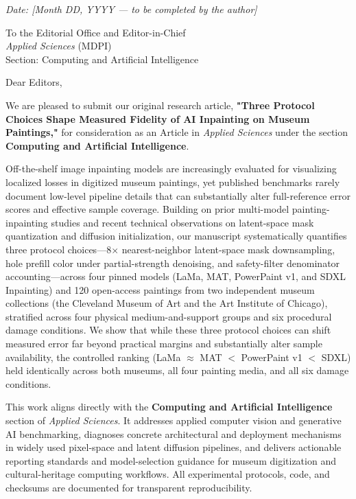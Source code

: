\documentclass[11pt,a4paper]{article}
\begin{document}
\emph{Date: {[}Month DD, YYYY --- to be completed by the author{]}}

To the Editorial Office and Editor-in-Chief\\
\emph{Applied Sciences} (MDPI)\\
Section: Computing and Artificial Intelligence

Dear Editors,

We are pleased to submit our original research article, \textbf{"Three Protocol Choices Shape Measured Fidelity of AI Inpainting on Museum Paintings,"} for consideration as an Article in \emph{Applied Sciences} under the section \textbf{Computing and Artificial Intelligence}.

Off-the-shelf image inpainting models are increasingly evaluated for visualizing localized losses in digitized museum paintings, yet published benchmarks rarely document low-level pipeline details that can substantially alter full-reference error scores and effective sample coverage. Building on prior multi-model painting-inpainting studies and recent technical observations on latent-space mask quantization and diffusion initialization, our manuscript systematically quantifies three protocol choices---8\ensuremath{\times} nearest-neighbor latent-space mask downsampling, hole prefill color under partial-strength denoising, and safety-filter denominator accounting---across four pinned models (LaMa, MAT, PowerPaint v1, and SDXL Inpainting) and 120 open-access paintings from two independent museum collections (the Cleveland Museum of Art and the Art Institute of Chicago), stratified across four physical medium-and-support groups and six procedural damage conditions. We show that while these three protocol choices can shift measured error far beyond practical margins and substantially alter sample availability, the controlled ranking (LaMa \(\approx\) MAT \(\!<\!\) PowerPaint v1 \(\!<\!\) SDXL) held identically across both museums, all four painting media, and all six damage conditions.

This work aligns directly with the \textbf{Computing and Artificial Intelligence} section of \emph{Applied Sciences}. It addresses applied computer vision and generative AI benchmarking, diagnoses concrete architectural and deployment mechanisms in widely used pixel-space and latent diffusion pipelines, and delivers actionable reporting standards and model-selection guidance for museum digitization and cultural-heritage computing workflows. All experimental protocols, code, and checksums are documented for transparent reproducibility.
\end{document}
